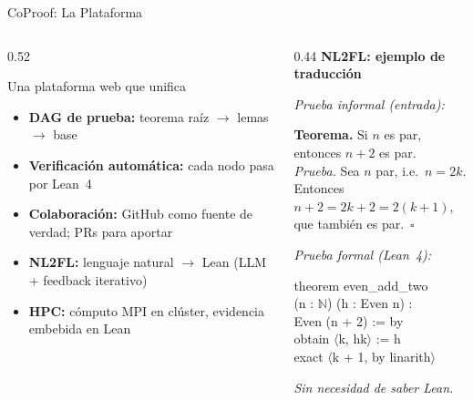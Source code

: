 \documentclass[aspectratio=169, 10pt]{beamer}
\begin{document}
\begin{frame}{CoProof: La Plataforma}
  \begin{columns}[T]
    \begin{column}{0.52\textwidth}
      \begin{block}{Una plataforma web que unifica}
        \begin{itemize}
          \item \textbf{DAG de prueba:} teorema ra\'{i}z $\to$ lemas $\to$ base
          \item \textbf{Verificaci\'{o}n autom\'{a}tica:} cada nodo pasa por Lean~4
          \item \textbf{Colaboraci\'{o}n:} GitHub como fuente de verdad; PRs para aportar
          \item \textbf{NL2FL:} lenguaje natural $\to$ Lean (LLM + feedback iterativo)
          \item \textbf{HPC:} c\'{o}mputo MPI en cl\'{u}ster, evidencia embebida en Lean
        \end{itemize}
      \end{block}
    \end{column}
    \begin{column}{0.44\textwidth}
      \textbf{NL2FL: ejemplo de traducci\'{o}n}
      \vspace{0.25cm}

      {\footnotesize\color{cpGray}\textit{Prueba informal (entrada):}}\\
      \colorbox{cpGray!10}{\parbox{\linewidth}{%
        \footnotesize\raggedright
        \textbf{Teorema.} Si $n$ es par, entonces $n+2$ es par.\\[3pt]
        \textit{Prueba.} Sea $n$ par, i.e.\ $n = 2k$.\\
        Entonces $n+2 = 2k+2 = 2(k{+}1)$,\\
        que tambi\'{e}n es par.~$\square$
      }}
      \vspace{0.3cm}

      {\footnotesize\color{leanpurple}\textit{Prueba formal (Lean~4):}}\\
      \colorbox{cpBlue!5}{\parbox{\linewidth}{%
        \ttfamily\scriptsize\color{leanpurple}
        theorem even\_add\_two\\[1pt]
        \hspace*{0.4em}(n : $\mathbb{N}$) (h : Even n) :\\[1pt]
        \hspace*{0.4em}Even (n + 2) := by\\[1pt]
        \hspace*{0.4em}obtain $\langle$k, hk$\rangle$ := h\\[1pt]
        \hspace*{0.4em}exact $\langle$k + 1, by linarith$\rangle$
      }}
      \vspace{0.3cm}

      {\small\color{cpGray}\textit{Sin necesidad de saber Lean.}}
    \end{column}
  \end{columns}
\end{frame}
\end{document}
